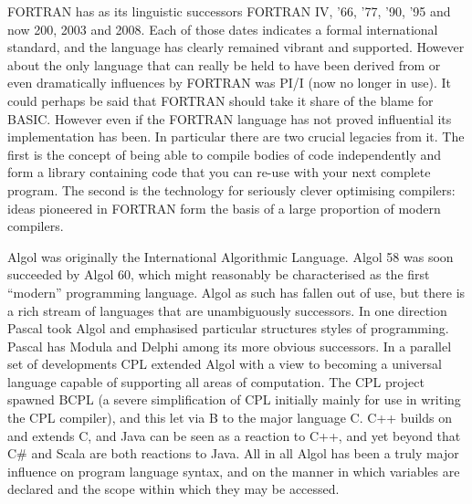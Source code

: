 FORTRAN has as its linguistic successors FORTRAN IV, '66, '77, '90, '95 and
now 200, 2003 and 2008. Each of those dates indicates a formal international
standard, and the language has clearly remained vibrant and supported. However
about the only language that can really be held to have been derived from
or even dramatically influences by FORTRAN was PI/I (now no longer in use). It
could perhaps be said that FORTRAN should take it share of the blame for
BASIC. However even if the FORTRAN language has not proved influential its
implementation has been. In particular there are two crucial legacies from
it. The first is the concept of being able to compile bodies of code
independently and form a library containing code that you can re-use with
your next complete program. The second is the technology for seriously
clever optimising compilers: ideas pioneered in FORTRAN form the basis
of a large proportion of modern compilers.

Algol was originally the International Algorithmic Language. Algol 58 was soon
succeeded by Algol 60, which might reasonably be characterised as the
first ``modern'' programming language. Algol as such has fallen out of
use, but there is a rich stream of languages that are unambiguously
successors. In one direction Pascal took Algol and emphasised particular
structures styles of programming. Pascal has Modula and Delphi among its
more obvious successors. In a parallel set of developments CPL extended
Algol with a view to becoming a universal language capable of supporting
all areas of computation. The CPL project spawned BCPL (a severe simplification
of CPL initially mainly for use in writing the CPL compiler), and this
let via B to the major language C. C++ builds on and extends C, and
Java can be seen as a reaction to C++, and yet beyond that C\# and Scala
are both reactions to Java. All in all Algol has been a truly major
influence on program language syntax, and on the manner in which
variables are declared and the scope within which they may be accessed.


